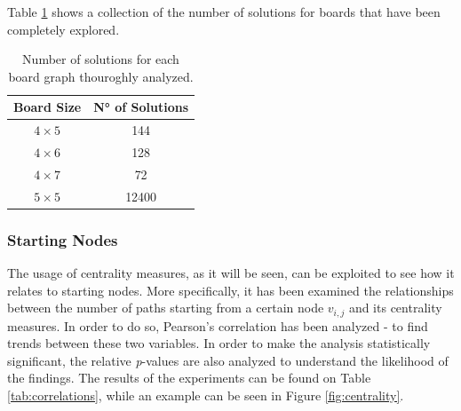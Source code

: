 \documentclass[conference]{IEEEtran}
\begin{document}
Table \ref{tab:sols} shows a collection of the number of solutions for boards that have been completely explored.

\begin{table}[ht]
	\centering
	\begin{tabular}{|c|c|}
		\hline
		\textbf{Board Size} & \textbf{N° of Solutions} \\ \hline
		\textbf{$4 \times 5$} & 144	\\ \hline
		\textbf{$4 \times 6$} & 128	\\ \hline
		\textbf{$4 \times 7$} & 72  \\ \hline
		\textbf{$5 \times 5$} & 12400 \\ \hline 
	\end{tabular}
	\caption{Number of solutions for each board graph thouroghly analyzed.}
	\label{tab:sols}
\end{table}

\subsubsection{Starting Nodes}
The usage of centrality measures, as it will be seen, can be exploited to see how it relates to starting nodes. More specifically, it has been examined the relationships between the number of paths starting from a certain node $v_{i, j}$ and its centrality measures. In order to do so, Pearson's correlation has been analyzed - to find trends between these two variables. In order to make the analysis statistically significant, the relative \textit{p}-values are also analyzed to understand the likelihood of the findings. The results of the experiments can be found on Table \ref{tab:correlations}, while an example can be seen in Figure \ref{fig:centrality}.
\end{document}
